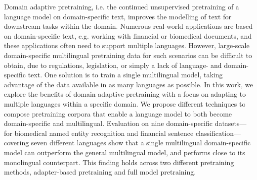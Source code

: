 Domain adaptive pretraining, i.e. the continued unsupervised pretraining of a language model on domain-specific text, improves the modelling of text for downstream tasks within the domain. Numerous real-world applications are based on domain-specific text, e.g. working with financial or biomedical documents, and these applications often need to support multiple languages. However, large-scale domain-specific multilingual pretraining data for such scenarios can be difficult to obtain, due to regulations, legislation, or simply a lack of language- and domain-specific text. One solution is to train a single multilingual model, taking advantage of the data available in as many languages as possible. In this work, we explore the benefits of domain adaptive pretraining with a focus on adapting to multiple languages within a specific domain. We propose different techniques to compose pretraining corpora that enable a language model to both become domain-specific and multilingual. Evaluation on nine domain-specific datasets---for biomedical named entity recognition and financial sentence classification---covering seven different languages show  that a single multilingual domain-specific model can outperform the general multilingual model, and performs close to its monolingual counterpart. This finding holds across two different pretraining methods, adapter-based pretraining and full model pretraining.

